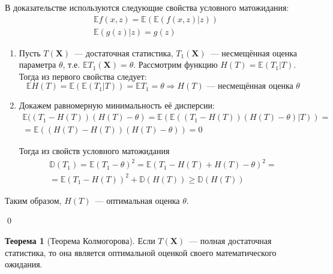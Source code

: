 \documentclass[oneside,final,14pt]{extreport}
\renewenvironment{proof}{{\bfseries Доказательство.}}{\qed}
\theoremstyle{plain}
\theoremstyle{definition}
\theoremstyle{named}
\newtheorem*{namedthm}{Теорема}
\begin{document}
\begin{proof}
В доказательстве используются следующие свойства условного матожидания: 
\begin{gather*}
    \mathbb{E} f(x, z)=\mathbb{E}(\mathbb{E}(f(x, z) | z)) \\
    \mathbb{E}(g(z) | z)=g(z)
\end{gather*}

\begin{enumerate}
    \item Пусть $T(\mathbf{X})$~--- достаточная статистика, $T_1(\mathbf{X})$~--- несмещённая оценка параметра $\theta$, т.е. $\mathbb{E} T_{1}(\mathbf{X})=\theta$. Рассмотрим функцию $H(T)=\mathbb{E}\left(T_{1} | T\right)$. Тогда из первого свойства следует:
    \begin{equation*}
        \mathbb{E} H(T)=\mathbb{E}\left(\mathbb{E}\left(T_{1} |     T\right)\right)=\mathbb{E} T_{1}=\theta \Rightarrow H(T)     \text{~--- несмещённая оценка~} \theta
    \end{equation*}

    \item Докажем равномерную минимальность её дисперсии:
    \begin{multline*}
        \mathbb{E}((T_{1}-H(T))(H(T)-\theta)
        = \mathbb{E}(\mathbb{E}((T_{1}-H(T))(H(T)-\theta) | T)) 
        = \\
        = \mathbb{E}((H(T)-H(T))(H(T)-\theta))
        = 0
    \end{multline*}

    Тогда из свойств условного матожидания
    \begin{multline*}
        \mathbb{D}\left(T_{1}\right) 
        = \mathbb{E}\left(T_{1}-\theta\right)^{2}=\mathbb{E}\left(T_{1}-H(T)+H(T)-\theta\right)^{2} =\\
        = \mathbb{E}\left(T_{1}-H(T)\right)^{2}+\mathbb{D}(H(T)) \geqslant \mathbb{D}(H(T))
    \end{multline*}
\end{enumerate}
Таким образом, $H(T)$~--- оптимальная оценка $\theta$.

\end{proof}

\begin{namedthm}[Теорема Колмогорова]
Если $T(\mathbf{X})$~--- полная достаточная статистика, то она является оптимальной оценкой своего математического ожидания.
\end{namedthm}
\end{document}
